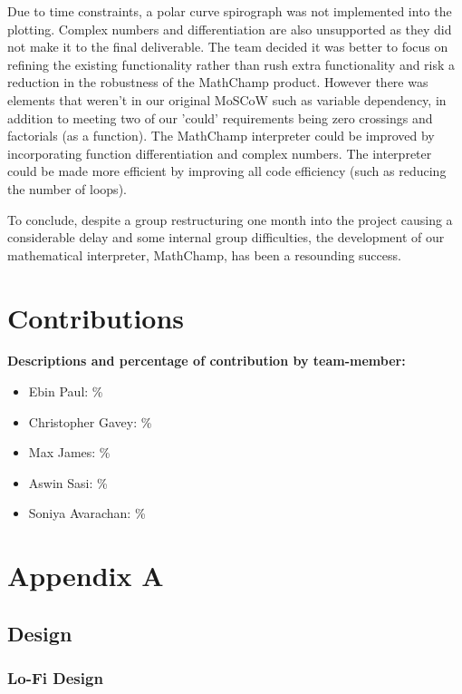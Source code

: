 \documentclass[a4paper, oneside, 11pt]{report}
\begin{document}
Due to time constraints,  a polar curve spirograph was not implemented into the plotting. Complex numbers and differentiation are also unsupported as they did not make it to the final deliverable. The team decided it was better to focus on refining the existing functionality rather than rush extra functionality and risk a reduction in the robustness of the MathChamp product. However there was elements that weren't in our original MoSCoW such as variable dependency, in addition to meeting two of our 'could' requirements being zero crossings and factorials (as a function). The MathChamp interpreter could be improved by incorporating function differentiation and complex numbers. The interpreter could be made more efficient by improving all code efficiency (such as reducing the number of loops).

To conclude, despite a group restructuring one month into the project causing a considerable delay and some internal group difficulties, the development of our mathematical interpreter, MathChamp, has been a resounding success. 



 \label{bibliography}

\nocite{*}

\chapter*{Contributions}
\textbf{Descriptions and percentage of contribution by team-member:}

\begin{itemize}
    \item Ebin Paul: \%
    \item Christopher Gavey: \%
    \item Max James: \%
    \item Aswin Sasi: \%
    \item Soniya Avarachan: \%
\end{itemize}

\chapter*{Appendix A}

\section{Design}\label{designs}
\subsection{Lo-Fi Design}
\end{document}
